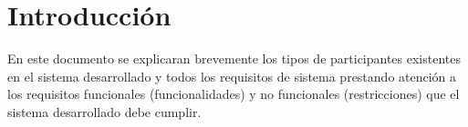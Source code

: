 \section{Introducción}

    En este documento se explicaran brevemente los tipos de participantes existentes en el sistema desarrollado y todos los requisitos de sistema prestando atención a los requisitos funcionales (funcionalidades) y no funcionales (restricciones) que el sistema desarrollado debe cumplir.
